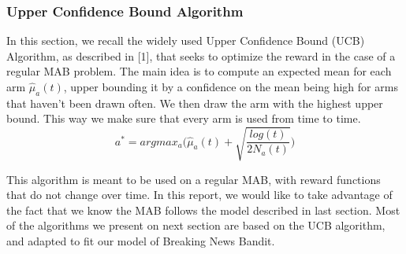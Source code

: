 \documentclass[french]{beamer}
\begin{document}
\begin{frame}
	\frametitle{Upper Confidence Bound Algorithm}
	
	In this section, we recall the widely used Upper Confidence Bound (UCB) Algorithm,
	as described in [1],
	that seeks to optimize the reward in the case of a regular MAB problem. The main
	idea is to compute an expected mean for each arm $\hat\mu_a(t)$, upper bounding it
	by a confidence on the mean being high for arms that haven't been drawn often. We
	then draw the arm with the highest upper bound.
	This way we make sure that every arm is used from time to time.
	\begin{equation*}
	a^* = argmax_{a} \Big(\hat\mu_a(t) + \sqrt{\frac{log(t)}{2N_a(t)}}\Big)
	\end{equation*}

	
	This algorithm is meant to be used on a regular MAB, with reward functions that do not
	change over time. In this report, we would like to take advantage of the fact that
	we know the MAB follows the model described in last section. Most of the algorithms
	we present on next section are based on the UCB algorithm, and adapted to fit our model
	of Breaking News Bandit.

	
\end{frame}
\end{document}
